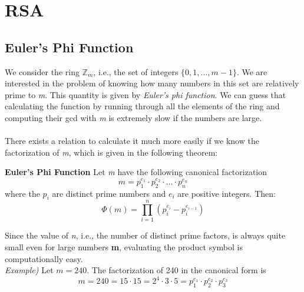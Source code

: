 

\newpage
\section{RSA}
\subsection{Euler's Phi Function}
We consider the ring $\mathbb{Z}_m$, i.e., the set of integers $\{0,1,...,m-1\}$. We are interested in the problem of knowing how many numbers in this set are relatively prime to \textit{m}. This quantity is given by \textit{Euler's phi function}. We can guess that calculating the function by running through all the elements of the ring and computing their gcd with \textit{m} is extremely slow if the numbers are large.\\\\
There exists a relation to calculate it much more easily if we know the factorization of \textit{m}, which is given in the following theorem:
\begin{framed}
    \hfill\break\textbf{Euler's Phi Function} Let \textit{m} have the following canonical factorization
    $$m = p_1^{e_1}\cdot p_2^{e_2}\cdot\dotsc\cdot p_n^{e_n}$$
    where the $p_i$ are distinct prime numbers and $e_i$ are positive integers. Then:
    $$\Phi(m)=\prod^n_{i=1}(p_i^{e_i}-p_i^{e_{i-1}})$$
\end{framed}
Since the value of \textit{n}, i.e., the number of distinct prime factors, is always quite small even for large numbers \textbf{m}, evaluating the product symbol is computationally easy.\\

\textit{Example)} Let $m=240$. The factorization of 240 in the canonical form is
$$m=240=15\cdot15=2^4\cdot3\cdot5=p_1^{e_1}\cdot p_2^{e_2}\cdot p_3^{e_3}$$

